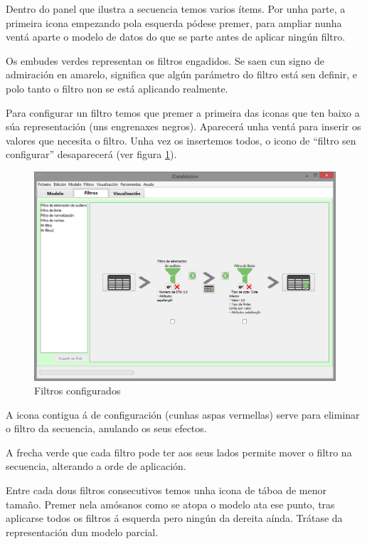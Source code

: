 Dentro do panel que ilustra a secuencia temos varios ítems. Por unha parte, a primeira icona empezando pola esquerda pódese premer, para ampliar nunha ventá aparte o modelo de datos do que se parte antes de aplicar ningún filtro.

Os embudes verdes representan os filtros engadidos. Se saen cun signo de admiración en amarelo, significa que algún parámetro do filtro está sen definir, e polo tanto o filtro non se está aplicando realmente.

Para configurar un filtro temos que premer a primeira das iconas que ten baixo a súa representación (uns engrenaxes negros). Aparecerá unha ventá para inserir os valores que necesita o filtro. Unha vez os insertemos todos, o icono de ``filtro sen configurar'' desaparecerá (ver figura \ref{filtrosConfigurados}).

\begin{figure}
\centering
\includegraphics[width=\textwidth,height=\textheight,keepaspectratio]{figuras/filtrosConfigurados}
\caption{Filtros configurados}
\label{filtrosConfigurados}
\end{figure}

A icona contigua á de configuración (cunhas aspas vermellas) serve para eliminar o filtro da secuencia, anulando os seus efectos.

A frecha verde que cada filtro pode ter aos seus lados permite mover o filtro na secuencia, alterando a orde de aplicación.

Entre cada dous filtros consecutivos temos unha icona de táboa de menor tamaño. Premer nela amósanos como se atopa o modelo ata ese punto, tras aplicarse todos os filtros á esquerda pero ningún da dereita aínda. Trátase da representación dun modelo parcial.

